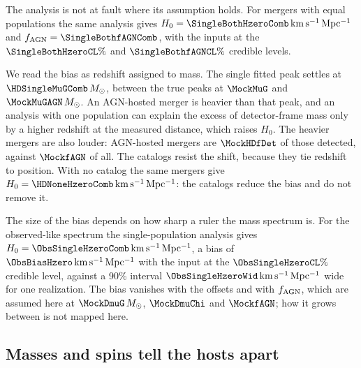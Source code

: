 \documentclass[aps,prd,reprint,superscriptaddress,nofootinbib,nolongbibliography,floatfix]{revtex4-2}
\newcommand{\kms}{\,\mathrm{km\,s^{-1}\,Mpc^{-1}}}
\newcommand{\Msun}{M_\odot}
\newcommand{\fagn}{f_{\rm AGN}}
\begin{document}
The analysis is not at fault where its assumption holds. %
For mergers with equal populations the same analysis gives $H_0=\SingleBothHzeroComb\kms$ and $\fagn=\SingleBothfAGNComb$, with the inputs at the $\SingleBothHzeroCL\%$ and $\SingleBothfAGNCL\%$ credible levels. %

We read the bias as redshift assigned to mass. %
The single fitted peak settles at $\HDSingleMuGComb\,\Msun$, between the true peaks at $\MockMuG$ and $\MockMuGAGN\,\Msun$. %
An AGN-hosted merger is heavier than that peak, and an analysis with one population can explain the excess of detector-frame mass only by a higher redshift at the measured distance, which raises $H_0$.
The heavier mergers are also louder: AGN-hosted mergers are $\MockHDfDet$ of those detected, against $\MockfAGN$ of all.
The catalogs resist the shift, because they tie redshift to position. %
With no catalog the same mergers give $H_0=\HDNoneHzeroComb\kms$: the catalogs reduce the bias and do not remove it. %

The size of the bias depends on how sharp a ruler the mass spectrum is.
For the observed-like spectrum the single-population analysis gives $H_0=\ObsSingleHzeroComb\kms$, a bias of $\ObsBiasHzero\kms$ with the input at the $\ObsSingleHzeroCL\%$ credible level, against a 90\% interval $\ObsSingleHzeroWid\kms$ wide for one realization. %
The bias vanishes with the offsets and with $\fagn$, which are assumed here at $\MockDmuG\,\Msun$, $\MockDmuChi$ and $\MockfAGN$; how it grows between is not mapped here.

\subsection{Masses and spins tell the hosts apart}
\label{sec:cure}
\end{document}
